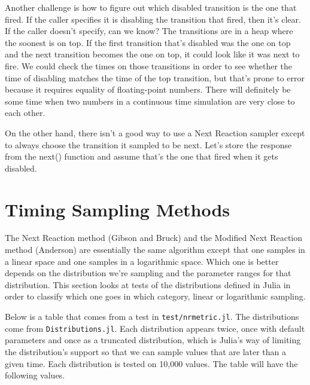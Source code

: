\documentclass{article}
\begin{document}
Another challenge is how to figure out which disabled transition is the one that fired. If the caller specifies it is disabling the transition that fired, then it's clear. If the caller doesn't specify, can we know? The transitions are in a heap where the soonest is on top. If the first transition that's disabled was the one on top and the next transition becomes the one on top, it could look like it was next to fire. We could check the times on those transitions in order to see whether the time of disabling matches the time of the top transition, but that's prone to error because it requires equality of floating-point numbers. There will definitely be some time when two numbers in a continuous time simulation are very close to each other.

On the other hand, there isn't a good way to use a Next Reaction sampler except to always choose the transition it sampled to be next. Let's store the response from the next() function and assume that's the one that fired when it gets disabled.

\section{Timing Sampling Methods}

The Next Reaction method (Gibson and Bruck) and the Modified Next Reaction method (Anderson) are essentially the same algorithm except that one samples in a linear space and one samples in a logarithmic space. Which one is better depends on the distribution we're sampling and the parameter ranges for that distribution. This section looks at tests of the distributions defined in Julia in order to classify which one goes in which category, linear or logarithmic sampling.

Below is a table that comes from a test in \texttt{test/nrmetric.jl}. The distributions come from \texttt{Distributions.jl}. Each distribution appears twice, once with default parameters and once as a truncated distribution, which is Julia's way of limiting the distribution's support so that we can sample values that are later than a given time. Each distribution is tested on 10,000 values. The table will have the following values.
\end{document}
